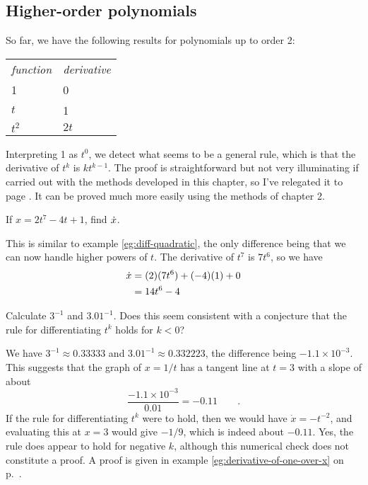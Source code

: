 \subsection{Higher-order polynomials}

So far, we have the following results for polynomials up to order 2:

\begin{tabular}{ll}
\emph{function} & \emph{derivative} \\
1 & 0 \\
$t$ & 1 \\
$t^2$ & $2t$
\end{tabular}

Interpreting 1 as $t^0$, we detect what seems to be a general
rule, which is that the derivative of $t^k$ is $kt^{k-1}$. The proof is straightforward
but not very illuminating if carried out with the methods developed in this chapter,
so I've relegated it to page \pageref{detour:polynomial-proof}. It can be proved
much more easily using the methods of chapter 2.

\begin{eg}
\egquestion If $x=2t^7-4t+1$, find $\dot{x}$.

\eganswer This is similar to example \ref{eg:diff-quadratic}, the only difference being
that we can now handle higher powers of $t$. The derivative of $t^7$ is $7t^6$, so
we have
\begin{align*}
  \dot{x} &= (2)(7t^6)+(-4)(1)+0 \\
        &= 14t^6-4
\end{align*}
\end{eg}

\begin{eg}\label{eg:der-one-over-x-approx}
\egquestion Calculate $3^{-1}$ and $3.01^{-1}$. Does this seem consistent with a conjecture
that the rule for differentiating $t^k$ holds for $k<0$?

\eganswer We have $3^{-1}\approx 0.33333$ and $3.01^{-1}\approx  0.332223$,
the difference being $-1.1\times 10^{-3}$. This suggests that the graph of $x=1/t$ has
a tangent line at $t=3$ with a slope of about
\begin{equation*}
  \frac{-1.1\times 10^{-3}}{0.01} = -0.11 \qquad .
\end{equation*}
If the rule for differentiating $t^k$ were to hold, then we would have
$\dot{x}=-t^{-2}$, and evaluating this at $x=3$ would give $-1/9$, which is
indeed about $-0.11$. Yes, the rule does appear to hold for negative $k$,
although this numerical check does not constitute a proof. A proof is given
in example \ref{eg:derivative-of-one-over-x} on p.~\pageref{eg:derivative-of-one-over-x}.
\end{eg}

